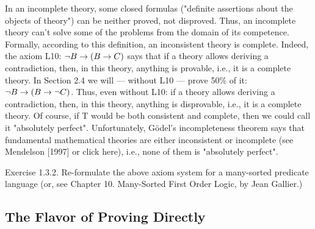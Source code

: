 In an incomplete theory, some closed formulas ("definite assertions about the objects of theory") can be
neither proved, not disproved. Thus, an incomplete theory can't solve some of the problems from the
domain of its competence.
Formally, according to this definition, an inconsistent theory is complete. Indeed, the axiom L10:
\(\neg B\rightarrow (B\rightarrow C)\) says that if a theory allows deriving a contradiction, then, in this theory, anything is
provable, i.e., it is a complete theory. In Section 2.4 we will --- without L10 --- prove 50\% of it:
\(\neg B\rightarrow (B\rightarrow \neg C)\). Thus, even without L10: if a theory allows deriving a contradiction, then, in this theory,
anything is disprovable, i.e., it is a complete theory.
Of course, if T would be both consistent and complete, then we could call it "absolutely perfect".
Unfortunately, G\"{o}del's incompleteness theorem says that fundamental mathematical theories are
either inconsistent or incomplete (see Mendelson [1997] or click here), i.e., none of them is "absolutely
perfect".

Exercise 1.3.2. Re-formulate the above axiom system for a many-sorted predicate language (or, see Chapter 10. Many-Sorted First Order Logic, by Jean Gallier.)

\subsection{The Flavor of Proving Directly}

